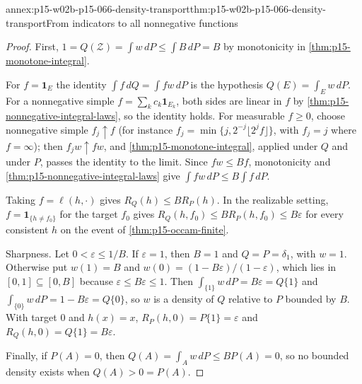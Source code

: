 \begin{annexitem}{annex:p15-w02b-p15-066-density-transport}{thm:p15-w02b-p15-066-density-transport}{From indicators to all nonnegative functions}
\begin{proof}
First, \(1=Q(\mathcal Z)=\int w\,dP\leq\int B\,dP=B\) by monotonicity in
\cref{thm:p15-monotone-integral}.

For \(f=\mathbf1_E\) the identity \(\int f\,dQ=\int fw\,dP\) is the
hypothesis \(Q(E)=\int_Ew\,dP\). For a nonnegative simple
\(f=\sum_kc_k\mathbf1_{E_k}\), both sides are linear in \(f\) by
\cref{thm:p15-nonnegative-integral-laws}, so the identity holds. For
measurable \(f\geq0\), choose nonnegative simple \(f_j\uparrow f\)
(for instance \(f_j=\min\{j,2^{-j}\lfloor2^jf\rfloor\}\), with
\(f_j=j\) where \(f=\infty\)); then \(f_jw\uparrow fw\), and
\cref{thm:p15-monotone-integral}, applied under \(Q\) and under \(P\),
passes the identity to the limit. Since \(fw\leq Bf\), monotonicity
and \cref{thm:p15-nonnegative-integral-laws} give
\(\int fw\,dP\leq B\int f\,dP\).

Taking \(f=\ell(h,\cdot)\) gives \(R_Q(h)\leq BR_P(h)\). In the
realizable setting, \(f=\mathbf1_{\{h\ne f_0\}}\) for the target \(f_0\)
gives \(R_Q(h,f_0)\leq BR_P(h,f_0)\leq B\varepsilon\) for every
consistent \(h\) on the event of \cref{thm:p15-occam-finite}.

Sharpness. Let \(0<\varepsilon\leq1/B\). If \(\varepsilon=1\), then
\(B=1\) and \(Q=P=\delta_1\), with \(w=1\). Otherwise put
\(w(1)=B\) and \(w(0)=(1-B\varepsilon)/(1-\varepsilon)\), which lies in
\([0,1]\subseteq[0,B]\) because \(\varepsilon\leq B\varepsilon\leq1\).
Then \(\int_{\{1\}}w\,dP=B\varepsilon=Q\{1\}\) and
\(\int_{\{0\}}w\,dP=1-B\varepsilon=Q\{0\}\), so \(w\) is a density of
\(Q\) relative to \(P\) bounded by \(B\). With target \(0\) and
\(h(x)=x\), \(R_P(h,0)=P\{1\}=\varepsilon\) and
\(R_Q(h,0)=Q\{1\}=B\varepsilon\).

Finally, if \(P(A)=0\), then \(Q(A)=\int_Aw\,dP\leq BP(A)=0\), so no
bounded density exists when \(Q(A)>0=P(A)\).
\end{proof}
\end{annexitem}

